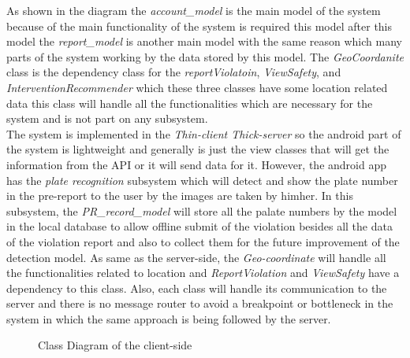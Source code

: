 As shown in the diagram the  \emph{account\_model} is the main model of the system because of the main functionality of the system is required this model after this model the  \emph{report\_model} is another main model with the same reason which many parts of the system working by the data stored by this model. The  \emph{GeoCoordanite} class is the dependency class for the  \emph{reportViolatoin},  \emph{ViewSafety}, and  \emph{InterventionRecommender} which these three classes have some location related data this class will handle all the functionalities which are necessary for the system and is not part on any subsystem.\\
The system is implemented in the  \emph{Thin-client\/ Thick-server} so the android part of the system is lightweight and generally is just the view classes that will get the information from the API or it will send data for it. However, the android app has the  \emph{plate recognition} subsystem which will detect and show the plate number in the pre-report to the user by the images are taken by him\/her.  In this subsystem, the  \emph{PR\_record\_model} will store all the palate numbers by the model in the local database to allow offline submit of the violation besides all the data of the violation report and also to collect them for the future improvement of the detection model. As same as the server-side, the  \emph{Geo-coordinate} will handle all the functionalities related to location and  \emph{ReportViolation} and  \emph{ViewSafety} have a dependency to this class. Also, each class will handle its communication to the server and there is no message router to avoid a breakpoint or bottleneck in the system in which the same approach is being followed by the server.\\


\begin{sidewaysfigure}
\begin{figure}[H]
\caption{Class Diagram of the client-side}
\label{fig:Class-client}
\centering

\end{figure}
\end{sidewaysfigure}
